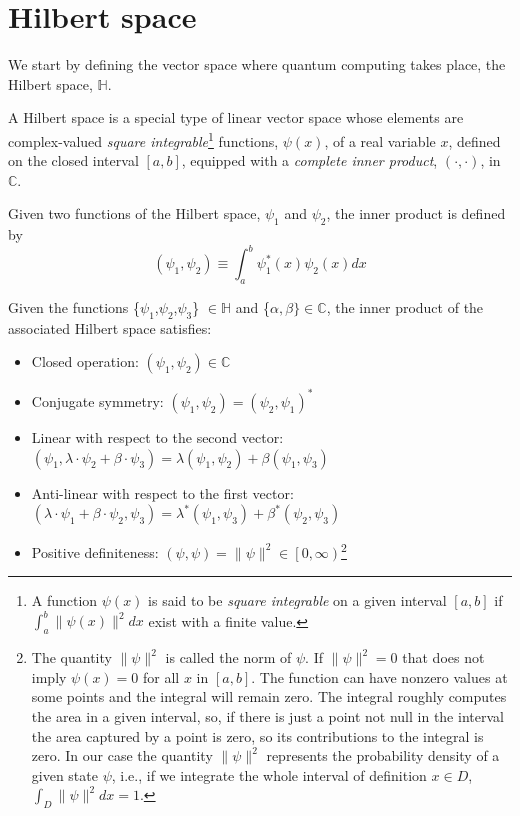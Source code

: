 \section{Hilbert space}
We start by defining the vector space where quantum computing takes place, the Hilbert space, $\mathbb{H}$.
\begin{definition}
A Hilbert space is a special type of linear vector space whose elements are complex-valued \textit{square integrable}\footnote{A function $\psi(x)$ is said to be \textit{square integrable} on a given interval $\left[a, b\right]$ if $\int_{a}^{b}\|\psi(x)\|^{2}dx$ exist with a finite value.} functions, $\psi(x)$, of a real variable $x$, defined on the closed interval $\left[a, b\right]$, equipped with a \textit{complete inner product}, $(\cdot,\cdot)$, in $\mathbb{C}$.
\end{definition}
\begin{definition}
Given two functions of the Hilbert space, $\psi_{1}$ and $\psi_{2}$, the inner product is defined by
\begin{equation}
    \left(\psi_{1}, \psi_{2}\right) \equiv \int^{b}_{a} \psi_{1}^{*}(x)\psi_{2}(x)dx
\end{equation}
\end{definition}
\begin{corollary}
Given the functions \{$\psi_{1}$,$\psi_{2}$,$\psi_{3}$\} $\in \mathbb{H}$ and \{$\alpha, \beta\} \in \mathbb{C}$, the inner product of the associated Hilbert space satisfies:
\begin{itemize}
    \item Closed operation: $(\psi_{1},\psi_{2})\in \mathbb{C}$
    \item Conjugate symmetry: $(\psi_{1},\psi_{2}) = (\psi_{2},\psi_{1})^{*}$
    \item Linear with respect to the second vector: $(\psi_{1},\lambda \cdot \psi_{2} + \beta\cdot\psi_{3}) = \lambda(\psi_{1},\psi_{2}) + \beta(\psi_{1},\psi_{3})$
    \item Anti-linear with respect to the first vector: $(\lambda \cdot \psi_{1} + \beta \cdot \psi_{2}, \psi_{3}) = \lambda^{*}(\psi_{1},\psi_{3}) + \beta^{*} (\psi_{2},\psi_{3})$
    \item Positive definiteness: $(\psi, \psi) = \lVert \psi \rVert^{2} \in \left[0,\infty\right)$\footnote{The quantity $\lVert \psi \rVert^{2}$ is called the norm of $\psi$. If $\lVert \psi \rVert^{2} = 0$ that does not imply $\psi(x) = 0$ for all $x$ in $\left[a,b\right]$. The function can have nonzero values at some points and the integral will remain zero. The integral roughly computes the area in a given interval, so, if there is just a point not null in the interval the area captured by a point is zero, so its contributions to the integral is zero. In our case the quantity $\lVert \psi \rVert^{2}$ represents the probability density of a given state $\psi$, i.e., if we integrate the whole interval of definition $x \in D$, $\int_{D}\lVert \psi \rVert^{2}dx = 1$.} 
\end{itemize}    
\end{corollary}
